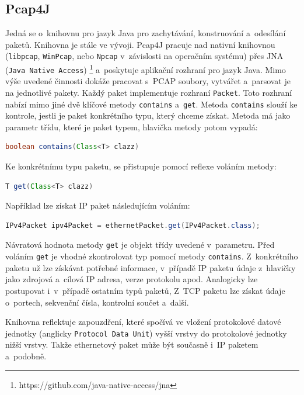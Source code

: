 \subsection{Pcap4J} \label{pcap4j}
Jedná se o~knihovnu pro jazyk Java pro zachytávání, konstruování a~odesílání paketů. Knihovna je stále ve vývoji. Pcap4J pracuje nad nativní knihovnou (\texttt{libpcap}, \texttt{WinPcap}, nebo \texttt{Npcap} v~závislosti na operačním systému) přes JNA (\texttt{Java Native Access})
\footnote{https://github.com/java-native-access/jna}
a~poskytuje aplikační rozhraní pro jazyk Java. Mimo výše uvedené činnosti dokáže pracovat s~PCAP soubory, vytvářet a~parsovat je na jednotlivé pakety. Každý paket implementuje rozhraní \texttt{Packet}. Toto rozhraní nabízí mimo jiné dvě klíčové metody \texttt{contains} a~\texttt{get}. Metoda \texttt{contains} slouží ke kontrole, jestli je paket konkrétního typu, který chceme získat. Metoda má jako parametr třídu, které je paket typem, hlavička metody potom vypadá:

\begin{lstlisting}[language=Java]
    boolean contains(Class<T> clazz)
\end{lstlisting}

\noindent Ke konkrétnímu typu paketu, se přistupuje pomocí reflexe voláním metody:

\begin{lstlisting}[language=Java]
    T get(Class<T> clazz)
\end{lstlisting}

\noindent Například lze získat IP paket následujícím voláním:

\begin{lstlisting}[language=Java]
    IPv4Packet ipv4Packet = ethernetPacket.get(IPv4Packet.class);
\end{lstlisting}

\noindent Návratová hodnota metody \texttt{get} je objekt třídy uvedené v~parametru. Před voláním \texttt{get} je vhodné zkontrolovat typ pomocí metody \texttt{contains}. Z~konkrétního paketu už lze získávat potřebné informace, v~případě IP paketu údaje z~hlavičky jako zdrojová a~cílová IP adresa, verze protokolu apod. Analogicky lze postupovat i~v~případě ostatním typů paketů, Z~TCP paketu lze získat údaje o~portech, sekvenční čísla, kontrolní součet a~další.

Knihovna reflektuje zapouzdření, které spočívá ve vložení protokolové datové jednotky (anglicky \texttt{Protocol Data Unit}) vyšší vrstvy do protokolové jednotky nižší vrstvy. Takže ethernetový paket může být současně i~IP paketem a~podobně.

